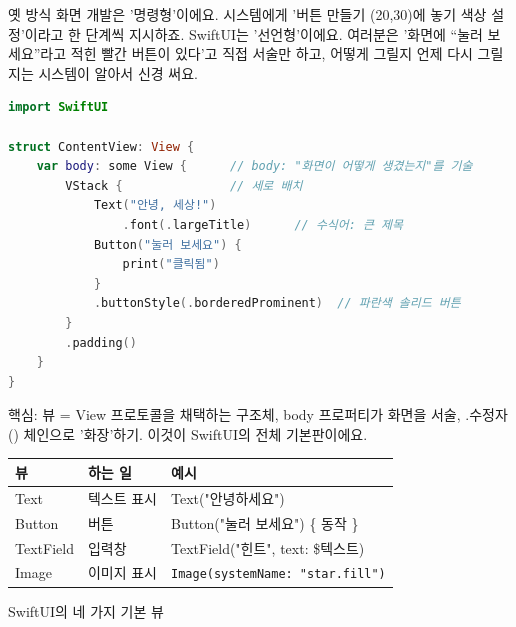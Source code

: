


옛 방식 화면 개발은 '명령형'이에요. 시스템에게 '버튼 만들기 (20,30)에 놓기 색상 설정'이라고 한 단계씩 지시하죠. SwiftUI는 '선언형'이에요. 여러분은 '화면에 “눌러 보세요”라고 적힌 빨간 버튼이 있다'고 직접 서술만 하고, 어떻게 그릴지 언제 다시 그릴지는 시스템이 알아서 신경 써요.

\begin{lstlisting}[language=Swift]
import SwiftUI

struct ContentView: View {
    var body: some View {      // body: "화면이 어떻게 생겼는지"를 기술
        VStack {               // 세로 배치
            Text("안녕, 세상!")
                .font(.largeTitle)      // 수식어: 큰 제목
            Button("눌러 보세요") {
                print("클릭됨")
            }
            .buttonStyle(.borderedProminent)  // 파란색 솔리드 버튼
        }
        .padding()
    }
}
\end{lstlisting}

핵심: 뷰 = View 프로토콜을 채택하는 구조체, body 프로퍼티가 화면을 서술, .수정자() 체인으로 '화장'하기. 이것이 SwiftUI의 전체 기본판이에요.


\begin{center}
\begin{tabularx}{\linewidth}{|X|X|X|}
\hline
\textbf{뷰} & \textbf{하는 일} & \textbf{예시} \tabularnewline
\hline
Text & 텍스트 표시 & Text("안녕하세요") \tabularnewline
Button & 버튼 & Button("눌러 보세요") \{ 동작 \} \tabularnewline
TextField & 입력창 & TextField("힌트", text: \$텍스트) \tabularnewline
Image & 이미지 표시 & \texttt{Image(systemName: "star.\allowbreak fill")} \tabularnewline
\hline
\end{tabularx}
\end{center}

\begin{center}\small\color{gray}SwiftUI의 네 가지 기본 뷰\end{center}

